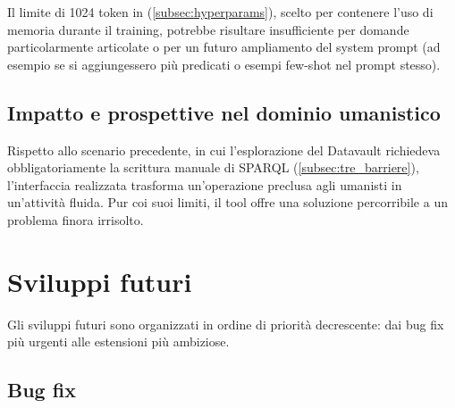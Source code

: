 Il limite di 1024 token in  (\cref{subsec:hyperparams}), scelto per contenere l'uso di memoria durante il training, potrebbe risultare insufficiente per domande particolarmente articolate o per un futuro ampliamento del system prompt (ad esempio se si aggiungessero più predicati o esempi few-shot nel prompt stesso).

\subsection{Impatto e prospettive nel dominio umanistico}\label{subsec:giustificazione}

Rispetto allo scenario precedente, in cui l'esplorazione del Datavault richiedeva obbligatoriamente la scrittura manuale di SPARQL (\cref{subsec:tre_barriere}), l'interfaccia realizzata trasforma un'operazione preclusa agli umanisti in un'attività fluida. Pur coi suoi limiti, il tool offre una soluzione percorribile a un problema finora irrisolto.


\section{Sviluppi futuri}\label{sec:sviluppi_futuri}

Gli sviluppi futuri sono organizzati in ordine di priorità decrescente: dai bug fix più urgenti alle estensioni più ambiziose.

\subsection{Bug fix}\label{subsec:bugfix}

